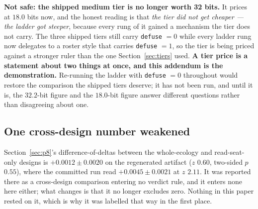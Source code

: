 \documentclass[11pt]{article}
\newcommand{\code}[1]{\texttt{#1}}
\begin{document}
\textbf{Not safe: the shipped medium tier is no longer worth 32 bits.} It prices at $18.0$ bits
now, and the honest reading is that \emph{the tier did not get cheaper --- the ladder got
steeper}, because every rung of it gained a mechanism the tier does not carry. The three shipped
tiers still carry \code{defuse} $=0$ while every ladder rung now delegates to a roster style that
carries \code{defuse} $=1$, so the tier is being priced against a stronger ruler than the one
Section~\ref{sec:tiers} used. \textbf{A tier price is a statement about two things at once, and
this addendum is the demonstration.} Re-running the ladder with \code{defuse} $=0$ throughout
would restore the comparison the shipped tiers deserve; it has not been run, and until it is, the
$32.2$-bit figure and the $18.0$-bit figure answer different questions rather than disagreeing
about one.

\subsection{One cross-design number weakened}

Section~\ref{sec:p8}'s difference-of-deltas between the whole-ecology and read-seat-only
designs is $+0.0012 \pm 0.0020$ on the regenerated artifact ($z$ $0.60$, two-sided $p$ $0.55$),
where the committed run read $+0.0045 \pm 0.0021$ at $z$ $2.11$. It was reported there as a
cross-design comparison entering no verdict rule, and it enters none here either; what changes is
that it no longer excludes zero. Nothing in this paper rested on it, which is why it was labelled
that way in the first place.
\end{document}
